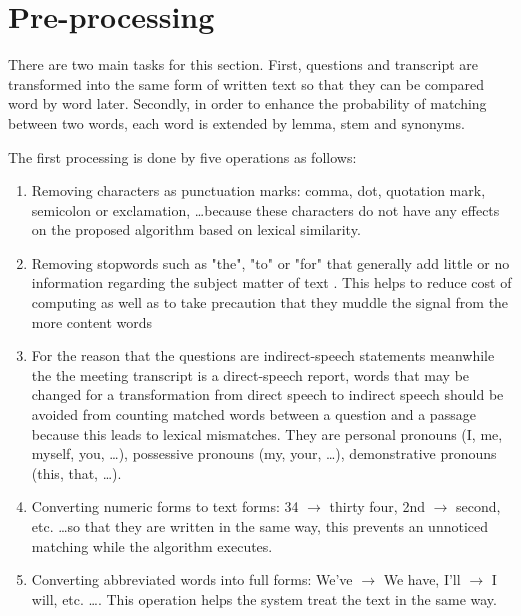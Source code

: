 


\section{Pre-processing}
There are two main tasks for this section. First, questions and transcript are transformed into the same form of written text so that they can be compared word by word later. Secondly, in order to enhance the probability of matching between two words, each word is extended by lemma, stem and synonyms.

The first processing is done by five operations as follows:

\begin{enumerate}
\item {Removing characters as punctuation marks: comma, dot, quotation mark, semicolon or exclamation, \ldots because these characters do not have any effects on the proposed algorithm based on lexical similarity. } 

\item {Removing stopwords such as "the", "to" or "for" that generally add little or no information regarding the subject matter of text \cite{mckechnie2001cap}.  This helps to reduce cost of computing as well as to take precaution that they muddle the signal from the more content words \cite{hirschman1999drr}}

\item {For the reason that the questions are indirect-speech statements meanwhile the the meeting transcript is a direct-speech report, words that may be changed for a transformation from direct speech to indirect speech should be avoided from counting matched words between a question and a passage because this leads to lexical mismatches. They are personal pronouns (I, me, myself, you, \ldots), possessive pronouns (my, your, \ldots), demonstrative pronouns (this, that, \ldots).}



\item {Converting numeric forms to text forms: 34 \ensuremath{\rightarrow} thirty four, 2nd \ensuremath{\rightarrow} second, etc. \ldots so that they are written in the same way, this prevents an unnoticed matching while the algorithm executes. }

\item {Converting abbreviated words into full forms: We've \ensuremath{\rightarrow} We have, I'll \ensuremath{\rightarrow} I will, etc. \ldots. This operation helps the system treat the text in the same way.}
\end{enumerate}

